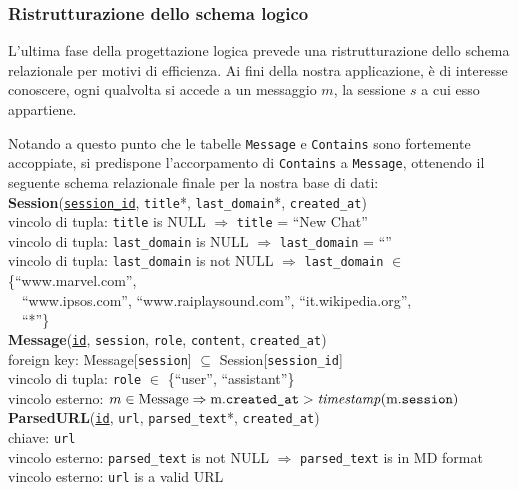 \subsubsection{Ristrutturazione dello schema logico}
L'ultima fase della progettazione logica prevede una ristrutturazione dello schema relazionale per motivi di efficienza. Ai fini della nostra applicazione, è di interesse conoscere, ogni qualvolta si accede a un messaggio $m$, la sessione $s$ a cui esso appartiene.

Notando a questo punto che le tabelle \texttt{Message} e \texttt{Contains} sono fortemente accoppiate, si predispone l'accorpamento di \texttt{Contains} a \texttt{Message}, ottenendo il seguente schema relazionale finale per la nostra base di dati:\\

\indent
\textbf{Session}(\underline{\texttt{session\_id}}, \texttt{title}*, \texttt{last\_domain}*, \texttt{created\_at})\\
\indent\indent vincolo di tupla: \texttt{title} is NULL $\Rightarrow $ \texttt{title} = ``New Chat''\\
\indent\indent vincolo di tupla: \texttt{last\_domain} is NULL $\Rightarrow$ \texttt{last\_domain} = ``''\\
\indent\indent vincolo di tupla: \texttt{last\_domain} is not NULL $\Rightarrow$ \texttt{last\_domain} $\in$ \{``www.marvel.com'',\\ 
\indent\indent\indent\indent\indent\indent\,\,\,\, ``www.ipsos.com'', ``www.raiplaysound.com'', ``it.wikipedia.org'',\\
\indent\indent\indent\indent\indent\indent\,\,\,\, ``*''\}\\
\indent
\textbf{Message}(\underline{\texttt{id}}, \texttt{session}, \texttt{role}, \texttt{content}, \texttt{created\_at})\\
\indent\indent foreign key: Message[\texttt{session}] $\subseteq$ Session[\texttt{session\_id}]\\
\indent\indent vincolo di tupla: \texttt{role} $\in$ \{``user'', ``assistant''\}\\
\indent\indent vincolo esterno: $m \in \text{Message} \Rightarrow \text{m.\texttt{created\_at}} > \text{\textit{timestamp}}(\text{m.\texttt{session}})$\\
\indent
\textbf{ParsedURL}(\underline{\texttt{id}}, \texttt{url}, \texttt{parsed\_text}*, \texttt{created\_at})\\
\indent\indent chiave: \texttt{url}\\
\indent\indent vincolo esterno: \texttt{parsed\_text} is not NULL $\Rightarrow$ \texttt{parsed\_text} is in MD format\\
\indent\indent vincolo esterno: \texttt{url} is a valid URL\\ 

